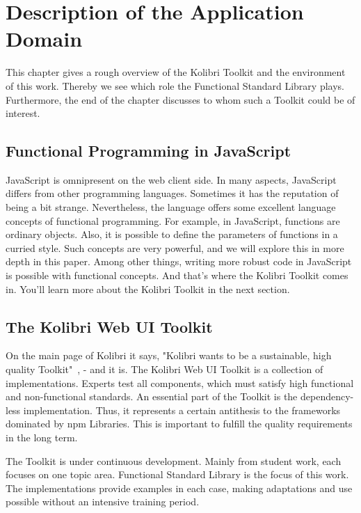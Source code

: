 \section{Description of the Application Domain}
\label{Description of the Application Domain}
This chapter gives a rough overview of the Kolibri Toolkit and the environment
of this work. Thereby we see which role the Functional Standard Library plays.
Furthermore, the end of the chapter discusses to whom such a Toolkit could be of interest.

\subsection{Functional Programming in JavaScript}
\label{sub:Functional Programming in JavaScript}
JavaScript is omnipresent on the web client side. 
In many aspects, JavaScript differs from other programming
languages. Sometimes it has the reputation of being a bit strange.
Nevertheless, the language offers some excellent language concepts of
functional programming. For example, in JavaScript, functions are ordinary
objects. Also, it is possible to define the parameters of functions in a
curried style. Such concepts are very powerful, and we will explore this in
more depth in this paper. Among other things, writing more robust code in
JavaScript is possible with functional concepts. And that's where the Kolibri
Toolkit comes in. You'll learn more about the Kolibri Toolkit in the next
section.

\subsection{The Kolibri Web UI Toolkit}
\label{The Kolibri Web UI Toolkit}
On the main page of Kolibri it says, "Kolibri wants to be a sustainable, high
quality Toolkit"~\cite{kolibri}, - and it is.
The Kolibri Web UI Toolkit is a collection of implementations. Experts test all
components, which must satisfy high functional and non-functional standards. An
essential part of the Toolkit is the dependency-less implementation. Thus, it
represents a certain antithesis to the frameworks dominated by npm Libraries.
This is important to fulfill the quality requirements in the long term.

The Toolkit is under continuous development. Mainly from student work, each
focuses on one topic area. Functional Standard Library is the focus of this
work. The implementations provide examples in each case, making adaptations and
use possible without an intensive training period.

